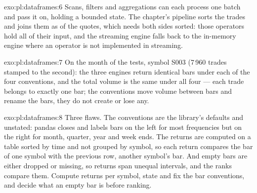 \begin{solution}{exo:pl:dataframes:6}
Scans, filters and aggregations can each process one batch and pass it on, holding a bounded state. The chapter's pipeline sorts the
trades and joins them as of the quotes, which needs both sides sorted: those operators hold all of their input, and the streaming engine
falls back to the in-memory engine where an operator is not implemented in streaming.
\end{solution}

\begin{solution}{exo:pl:dataframes:7}
On the month of the tests, symbol S003 (7\,960 trades stamped to the second): the three engines return identical bars under each of the
four conventions, and the total volume is the same under all four --- each trade belongs to exactly one bar; the conventions move volume
between bars and rename the bars, they do not create or lose any.
\end{solution}

\begin{solution}{exo:pl:dataframes:8}
Three flaws. The conventions are the library's defaults and unstated: pandas closes and labels bars on the left for most frequencies but on
the right for month, quarter, year and week ends. The returns are computed on a table sorted by time and not grouped by symbol, so each
return compares the bar of one symbol with the previous row, another symbol's bar. And empty bars are either dropped or missing, so returns
span unequal intervals, and the ranks compare them. Compute returns per symbol, state and fix the bar conventions, and decide what an empty
bar is before ranking.
\end{solution}

